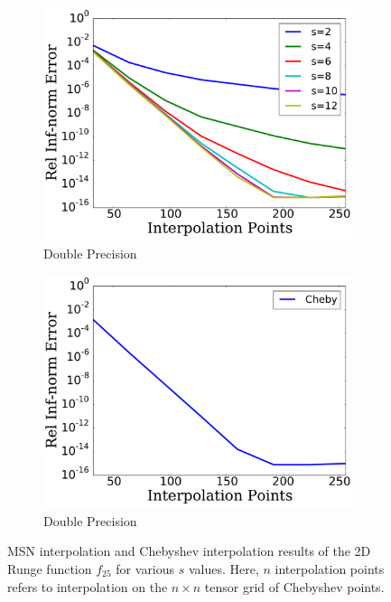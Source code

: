 \begin{figure}[p]
    \begin{subfigure}{0.45\textwidth}
    \includegraphics[width=\textwidth]{plots/msn_2n_fast_smooth_R_25_double.pdf}
    \caption{Double Precision}
    \end{subfigure}
    \begin{subfigure}{0.45\textwidth}
    \includegraphics[width=\textwidth]{plots/cheby_interp_smooth_R_25_double.pdf}
    \caption{Double Precision}
    \end{subfigure}
\caption[Smooth Interpolation Comparison: 2D Runge Function $R=25$]{
MSN interpolation and Chebyshev interpolation results
of the 2D Runge function $f_{25}$ for various $s$ values.
Here, $n$ interpolation points refers to interpolation on the $n\times n$
tensor grid of Chebyshev points.
}
\label{fig:smooth_comparison_2d_runge_25}
\end{figure}



